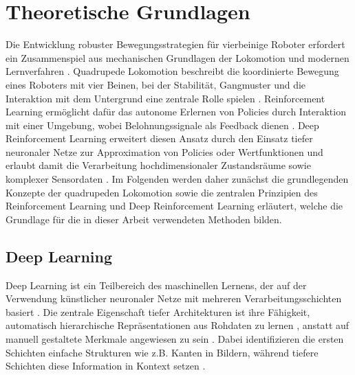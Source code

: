 \chapter{Theoretische Grundlagen}\label{ch:theoretical_basics}
Die Entwicklung robuster Bewegungsstrategien für vierbeinige Roboter erfordert ein Zusammenspiel aus mechanischen Grundlagen der Lokomotion und modernen Lernverfahren \cite{hwangboLearningAgileDynamic2019, hutterANYmalHighlyMobile2016}. Quadrupede Lokomotion beschreibt die koordinierte Bewegung eines Roboters mit vier Beinen, bei der Stabilität, Gangmuster und die Interaktion mit dem Untergrund eine zentrale Rolle spielen \cite{hwangboLearningAgileDynamic2019, hutterANYmalHighlyMobile2016}. Reinforcement Learning ermöglicht dafür das autonome Erlernen von Policies durch Interaktion mit einer Umgebung, wobei Belohnungssignale als Feedback dienen \cite{silverRewardEnough2021, zhangORSOAcceleratingReward2025, Kober_IJRR_2013}. Deep Reinforcement Learning erweitert diesen Ansatz durch den Einsatz tiefer neuronaler Netze zur Approximation von Policies oder Wertfunktionen und erlaubt damit die Verarbeitung hochdimensionaler Zustandsräume sowie komplexer Sensordaten \cite{rudin2022learningwalkminutesusing, tangDeepReinforcementLearning2024, cobbe2019quantifyinggeneralizationreinforcementlearning}. Im Folgenden werden daher zunächst die grundlegenden Konzepte der quadrupeden Lokomotion sowie die zentralen Prinzipien des Reinforcement Learning und Deep Reinforcement Learning erläutert, welche die Grundlage für die in dieser Arbeit verwendeten Methoden bilden.
\section{Deep Learning}
\label{dl_explain}
Deep Learning ist ein Teilbereich des maschinellen Lernens, der auf der Verwendung künstlicher neuronaler Netze mit mehreren Verarbeitungsschichten basiert \cite{Goodfellow-et-al-2016, francois-lavetIntroductionDeepReinforcement2018}. Die zentrale Eigenschaft tiefer Architekturen ist ihre Fähigkeit, automatisch hierarchische Repräsentationen aus Rohdaten zu lernen \cite{francois-lavetIntroductionDeepReinforcement2018}, anstatt auf manuell gestaltete Merkmale angewiesen zu sein \cite{Goodfellow-et-al-2016}. Dabei identifizieren die ersten Schichten einfache Strukturen wie z.B. Kanten in Bildern, während tiefere Schichten diese Information in Kontext setzen \cite{Goodfellow-et-al-2016}. 
